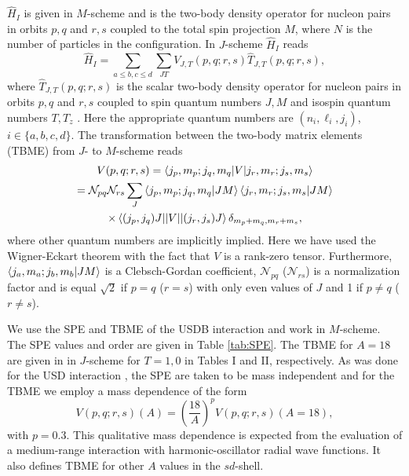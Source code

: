 $\hat H_I$ is given in $M$-scheme and is the two-body density operator for nucleon pairs in orbits $p,q$ and $r,s$ coupled to the total spin projection $M$, where $N$ is the number of particles in the configuration. In $J$-scheme $\hat H_I$ reads 
\begin{equation}
	\hat H_I =  \sum_{a\leq b,c \leq d} \sum_{JT} V_{J,T}(p,q;r,s) \hat T_{J,T}(p,q;r,s),
\end{equation}
where $\hat T_{J,T}(p,q;r,s)$ is the scalar two-body density operator for nucleon pairs in orbits $p,q$ and $r,s$ coupled to spin quantum numbers $J,M$ and isospin quantum numbers $T,T_z$ \cite{Brown2006}. Here the appropriate quantum numbers are $(n_i,\ell_i,j_i)$, $i \in \{a,b,c,d\}$. The transformation between the two-body matrix elements (TBME) from $J$- to $M$-scheme reads
\begin{multline}
	V(p,q;r,s)  =  \braket{j_{p},m_{p};j_{q},m_{q}|V|j_{r},m_{r};j_{s},m_{s}} \\ 
			    =  \mathcal{N}_{pq} \mathcal{N}_{rs} \sum_{J} \braket{j_{p},m_{p};j_{q},m_{q}|JM} \braket{j_{r},m_{r};j_{s},m_{s}|JM} \\
			   	\times \braket{(j_{p},j_{q})J||V||(j_{r},j_{s})J} \delta_{m_p+m_q,m_r+m_s},
\end{multline}
where other quantum numbers are implicitly implied. Here we have used the Wigner-Eckart theorem with the fact that $ V $ is a rank-zero tensor. Furthermore, $\braket{j_{a},m_{a};j_{b},m_{b}|JM}$ is a Clebsch-Gordan coefficient, $ \mathcal{N}_{pq} $ ($ \mathcal{N}_{rs} $) is a normalization factor and is equal $ \sqrt{2} $ if $ p=q $ ($ r=s $) with only even values of $ J $ and 1 if $ p \not=q $ ($ r \not=s $).

We use the SPE and TBME of the USDB interaction \cite{Brown2006} and work in $M$-scheme. The SPE values and order are given in Table \ref{tab:SPE}. The TBME for $A=18$ are given in \cite{Brown2006} in $J$-scheme for $T=1,0$ in Tables I and II, respectively. As was done for the USD interaction \cite{Wildenthal1984}, the SPE are taken to be mass independent and for the TBME we employ a mass dependence of the form
\begin{equation}
	V(p,q;r,s)(A) = \left( \frac{18}{A} \right)^p V(p,q;r,s)(A=18),
\end{equation}
with $p=0.3$. This qualitative mass dependence is expected from the evaluation of a medium-range interaction with harmonic-oscillator radial wave functions. It also defines TBME for other $A$ values in the $sd$-shell.

